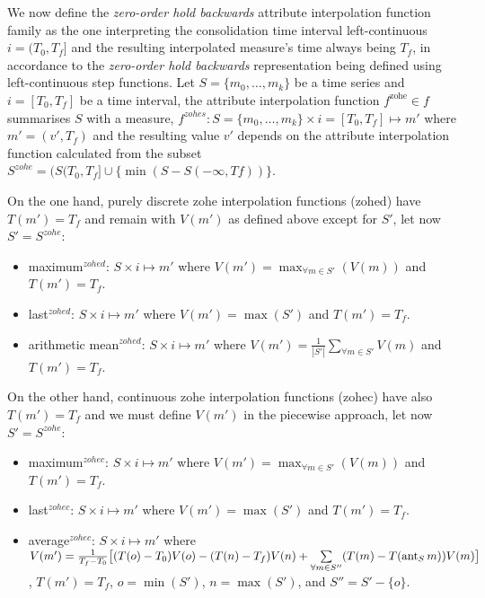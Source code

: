 We now define the \emph{zero-order hold backwards} attribute
interpolation function family as the one interpreting the
consolidation time interval left-continuous $i=(T_0,T_f]$ and the
resulting interpolated measure's time always being $T_f$, in
accordance to the \emph{zero-order hold backwards} representation
being defined using left-continuous step functions.  Let
$S=\{m_0,\ldots,m_k\}$ be a time series and $i=[T_0,T_f]$ be a time
interval, the attribute interpolation function $f^{\text{zohe}}\in f$
summarises $S$ with a measure, $f^{zohes}: S=\{m_0,\ldots,m_k\} \times
i=[T_0,T_f] \mapsto m'$ where $m'=(v',T_f)$ and the resulting value
$v'$ depends on the attribute interpolation function calculated from
the subset $S^{zohe}=(S(T_0,T_f] \cup \{\min(S-S(-\infty,Tf))\}$.

On the one hand, purely discrete zohe interpolation functions (zohed)
have $T(m')=T_f$ and remain with $V(m')$ as defined above except for
$S'$, let now $S'=S^{zohe}$:
\begin{itemize}
\item maximum$^{zohed}$: $S \times i \mapsto m'$ where $V(m') =
  \max_{\forall m \in S'}(V(m))$ and $T(m')=T_f$.
\item last$^{zohed}$: $S \times i \mapsto m'$ where $V(m') = \max(S')$ and
  $T(m')=T_f$.
\item arithmetic mean$^{zohed}$: $S \times i \mapsto m'$ where $V(m')
  = \frac{1}{|S'|} \sum\limits_{\forall m\in S'} V(m)$ and
  $T(m')=T_f$. 
\end{itemize}
On the other hand, continuous zohe interpolation functions (zohec)
have also $T(m')=T_f$ and we must define $V(m')$ in the piecewise
approach, let now $S'=S^{zohe}$:
\begin{itemize}
\item maximum$^{zohec}$: $S \times i \mapsto m'$ where $V(m') =
  \max_{\forall m \in S'}(V(m))$ and $T(m')=T_f$.
\item last$^{zohec}$: $S \times i \mapsto m'$ where $V(m') = \max(S')$
  and $T(m')=T_f$.
\item average$^{zohec}$: $S \times i \mapsto m'$ where $V(m') =
  \frac{1}{T_f-T_0} \big[ (T(o)-T_0)V(o) -( T(n)-T_f)V(n) +
  \sum\limits_{\forall m \in S''}( T(m)- T(\operatorname*{ant}_S m) )V(m) \big]$,
  $T(m')=T_f$, $o=\min(S')$, $n=\max(S')$, and $S''= S' - \{o\}$.
\end{itemize}



